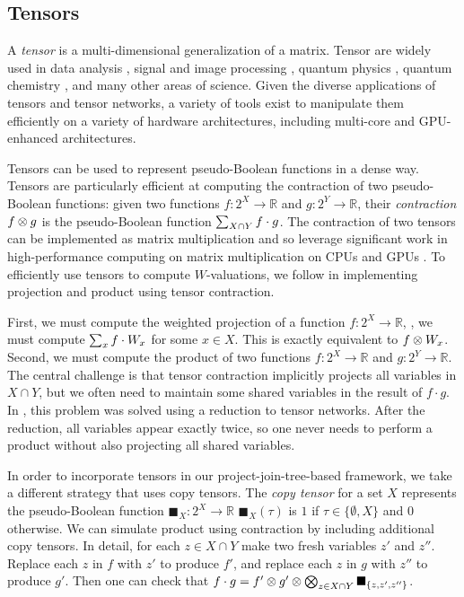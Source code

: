 \subsection{Tensors}

A \emph{tensor} is a multi-dimensional generalization of a matrix.
Tensor are widely used in data analysis \cite{cichocki2014era}, signal and image processing \cite{cichocki2015tensor}, quantum physics \cite{arad2010quantum}, quantum chemistry \cite{smilde2005multi}, and many other areas of science.
Given the diverse applications of tensors and tensor networks, a variety of tools \cite{baumgartner2005synthesis,kjolstad2017tensor} exist to manipulate them efficiently on a variety of hardware architectures, including multi-core and GPU-enhanced architectures.

Tensors can be used to represent pseudo-Boolean functions in a dense way.
Tensors are particularly efficient at computing the contraction of two pseudo-Boolean functions: given two functions $f: 2^X \to \mathbb{R}$ and $g: 2^Y \to \mathbb{R}$, their \emph{contraction} $f \otimes g$ is the pseudo-Boolean function $\sum_{X \cap Y} f \cdot g$.
The contraction of two tensors can be implemented as matrix multiplication and so leverage significant work in high-performance computing on matrix multiplication on CPUs \cite{lawson1979basic} and GPUs \cite{fatahalian2004understanding}.
To efficiently use tensors to compute $W$-valuations, we follow \cite{dudek2019efficient} in implementing projection and product using tensor contraction.

First, we must compute the weighted projection of a function $f: 2^X \to \mathbb{R}$, \ie, we must compute $\sum_x f \cdot W_x$ for some $x \in X$.
This is exactly equivalent to $f \otimes W_x$.
Second, we must compute the product of two functions $f: 2^X \to \mathbb{R}$ and $g: 2^Y \to \mathbb{R}$.
The central challenge is that tensor contraction implicitly projects all variables in $X \cap Y$, but we often need to maintain some shared variables in the result of $f \cdot g$.
In \cite{dudek2019efficient}, this problem was solved using a reduction to tensor networks.
After the reduction, all variables appear exactly twice, so one never needs to perform a product without also projecting all shared variables.

In order to incorporate tensors in our project-join-tree-based framework, we take a different strategy that uses copy tensors.
The \emph{copy tensor} for a set $X$ represents the pseudo-Boolean function $\blacksquare_X: 2^X \to \mathbb{R}$ \st{} $\blacksquare_X(\tau)$ is $1$ if $\tau \in \{ \emptyset, X \}$ and $0$ otherwise.
We can simulate product using contraction by including additional copy tensors.
In detail, for each $z \in X \cap Y$ make two fresh variables $z'$ and $z''$.
Replace each $z$ in $f$ with $z'$ to produce $f'$, and replace each $z$ in $g$ with $z''$ to produce $g'$.
Then one can check that $f \cdot g = f' \otimes g' \otimes \bigotimes_{z \in X \cap Y} \blacksquare_{\{z, z', z''\}}$.


